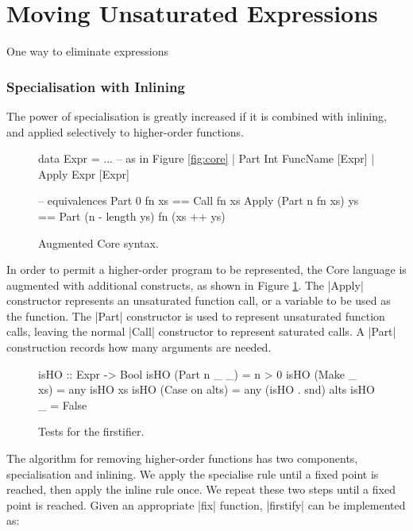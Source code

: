 \section{Moving Unsaturated Expressions}

One way to eliminate expressions

\subsubsection{Specialisation with Inlining}

The power of specialisation is greatly increased if it is combined with inlining, and applied selectively to higher-order functions.

\begin{figure}
\ignore\begin{code}
data Expr  =  ... -- as in Figure {\ref{fig:core}}
           |  Part   Int FuncName [Expr]
           |  Apply  Expr [Expr]

-- equivalences
Part 0 fn xs == Call fn xs
Apply (Part n fn xs) ys == Part (n - length ys) fn (xs ++ ys)
\end{code}
\caption{Augmented Core syntax.}
\label{fig:core_ho}
\end{figure}

In order to permit a higher-order program to be represented, the Core language is augmented with additional constructs, as shown in Figure \ref{fig:core_ho}. The |Apply| constructor represents an unsaturated function call, or a variable to be used as the function. The |Part| constructor is used to represent unsaturated function calls, leaving the normal |Call| constructor to represent saturated calls. A |Part| construction records how many arguments are needed.

\begin{figure}
\ignore\begin{code}
isHO :: Expr -> Bool
isHO (Part n _ _)    = n > 0
isHO (Make _ xs)     = any isHO xs
isHO (Case on alts)  = any (isHO . snd) alts
isHO _               = False
\end{code}
\caption{Tests for the firstifier.}
\label{fig:isHO}
\end{figure}

The algorithm for removing higher-order functions has two components, specialisation and inlining. We apply the specialise rule until a fixed point is reached, then apply the inline rule once. We repeat these two steps until a fixed point is reached. Given an appropriate |fix| function, |firstify| can be implemented as:

